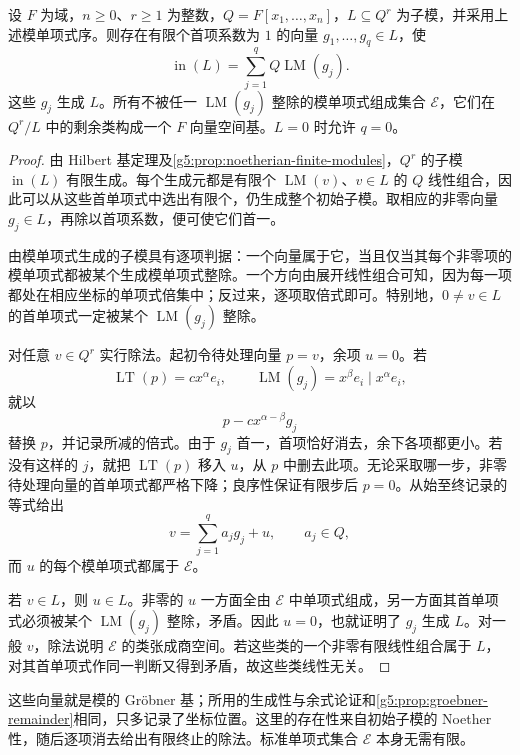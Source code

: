 \begin{lemma}\label{g5:lem:module-standard-monomials}
	设 \(F\) 为域，\(n\geq0\)、\(r\geq1\) 为整数，\(Q=F[x_1,\ldots,x_n]\)，\(L\subseteq Q^r\) 为子模，并采用上述模单项式序。则存在有限个首项系数为 \(1\) 的向量 \(g_1,\ldots,g_q\in L\)，使
	\[
		\operatorname{in}(L)
		=\sum_{j=1}^qQ\operatorname{LM}(g_j).
	\]
	这些 \(g_j\) 生成 \(L\)。所有不被任一 \(\operatorname{LM}(g_j)\) 整除的模单项式组成集合 \(\mathcal E\)，它们在 \(Q^r/L\) 中的剩余类构成一个 \(F\) 向量空间基。\(L=0\) 时允许 \(q=0\)。
\end{lemma}
\begin{proof}
	由 Hilbert 基定理及\cref{g5:prop:noetherian-finite-modules}，\(Q^r\) 的子模 \(\operatorname{in}(L)\) 有限生成。每个生成元都是有限个 \(\operatorname{LM}(v)\)、\(v\in L\) 的 \(Q\) 线性组合，因此可以从这些首单项式中选出有限个，仍生成整个初始子模。取相应的非零向量 \(g_j\in L\)，再除以首项系数，便可使它们首一。

	由模单项式生成的子模具有逐项判据：一个向量属于它，当且仅当其每个非零项的模单项式都被某个生成模单项式整除。一个方向由展开线性组合可知，因为每一项都处在相应坐标的单项式倍集中；反过来，逐项取倍式即可。特别地，\(0\ne v\in L\) 的首单项式一定被某个 \(\operatorname{LM}(g_j)\) 整除。

	对任意 \(v\in Q^r\) 实行除法。起初令待处理向量 \(p=v\)，余项 \(u=0\)。若
	\[
		\operatorname{LT}(p)=c x^\alpha e_i,
		\qquad
		\operatorname{LM}(g_j)=x^\beta e_i\mid x^\alpha e_i,
	\]
	就以
	\[
		p-cx^{\alpha-\beta}g_j
	\]
	替换 \(p\)，并记录所减的倍式。由于 \(g_j\) 首一，首项恰好消去，余下各项都更小。若没有这样的 \(j\)，就把 \(\operatorname{LT}(p)\) 移入 \(u\)，从 \(p\) 中删去此项。无论采取哪一步，非零待处理向量的首单项式都严格下降；良序性保证有限步后 \(p=0\)。从始至终记录的等式给出
	\[
		v=\sum_{j=1}^q a_jg_j+u,
		\qquad a_j\in Q,
	\]
	而 \(u\) 的每个模单项式都属于 \(\mathcal E\)。

	若 \(v\in L\)，则 \(u\in L\)。非零的 \(u\) 一方面全由 \(\mathcal E\) 中单项式组成，另一方面其首单项式必须被某个 \(\operatorname{LM}(g_j)\) 整除，矛盾。因此 \(u=0\)，也就证明了 \(g_j\) 生成 \(L\)。对一般 \(v\)，除法说明 \(\mathcal E\) 的类张成商空间。若这些类的一个非零有限线性组合属于 \(L\)，对其首单项式作同一判断又得到矛盾，故这些类线性无关。
\end{proof}

这些向量就是模的 Gröbner 基；所用的生成性与余式论证和\cref{g5:prop:groebner-remainder}相同，只多记录了坐标位置。这里的存在性来自初始子模的 Noether 性，随后逐项消去给出有限终止的除法。标准单项式集合 \(\mathcal E\) 本身无需有限。

